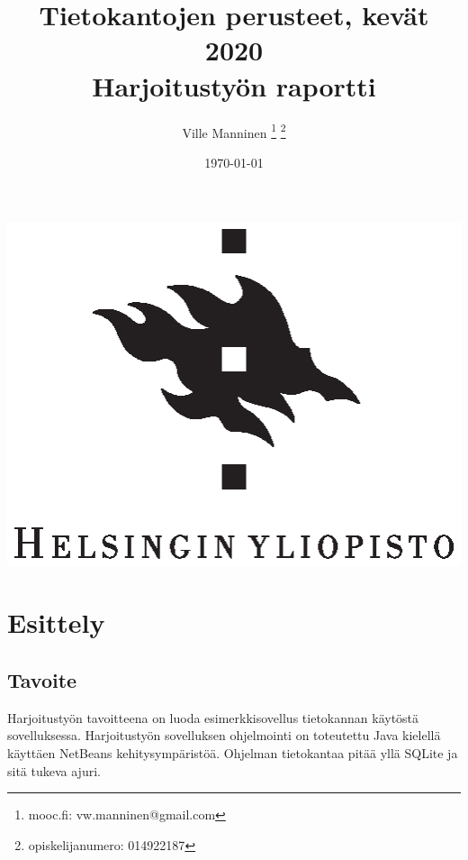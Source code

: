 \documentclass[11pt,a4paper]{article}
\begin{document}
\author{Ville Manninen
\thanks{mooc.fi: vw.manninen@gmail.com}
\thanks{opiskelijanumero: 014922187}}
\date{\today}
\title{Tietokantojen perusteet, kevät 2020 \\
Harjoitustyön raportti}
\maketitle
\begin{center}
\vspace{2cm}
\includegraphics{university-of-helsinki-2.eps} 
\end{center}
\newpage
\tableofcontents
\newpage
\section{Esittely}

\subsection{Tavoite}
Harjoitustyön tavoitteena on luoda esimerkkisovellus tietokannan käytöstä sovelluksessa.
Harjoitustyön sovelluksen ohjelmointi on toteutettu Java kielellä käyttäen NetBeans kehitysympäristöä. Ohjelman tietokantaa pitää yllä SQLite ja sitä tukeva ajuri.
\end{document}
